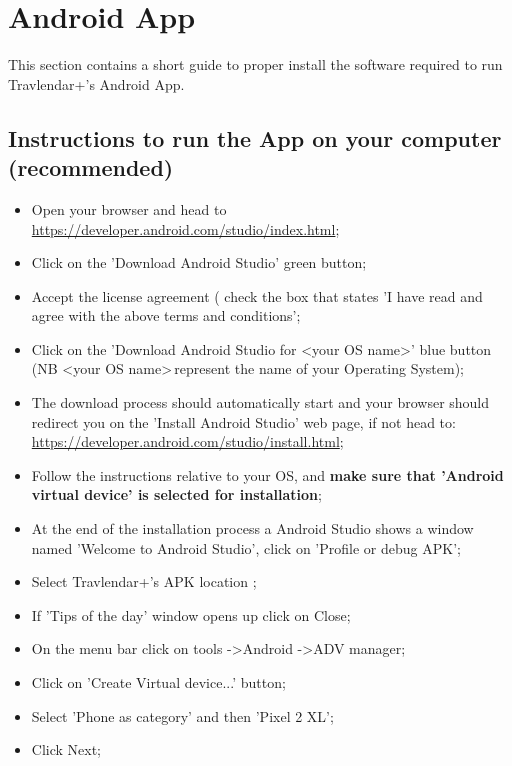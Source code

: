 \section{Android App}
\label{sect:Android App}
This section contains a short guide to proper install the software required to run Travlendar+'s Android App.

\subsection{Instructions to run the App on your computer (recommended)}
\label{subsect:Computer Instructions}
\begin{itemize}
	\item Open your browser and head to \\ \href{https://developer.android.com/studio/index.html}{\color{blue}https://developer.android.com/studio/index.html};
	\item Click on the 'Download Android Studio' green button;
	\item Accept the license agreement ( check the box that states 'I have read and agree with the above terms and conditions';
	\item Click on the 'Download Android Studio for \textless your OS name\textgreater' blue button (NB \textless your OS name\textgreater  \,represent the name of your Operating System);
	\item The download process should automatically start and your browser should redirect you on the 'Install Android Studio' web page, if not head to: \href{https://developer.android.com/studio/install.html}{\color{blue}https://developer.android.com/studio/install.html};
	\item Follow the instructions relative to your OS, and \textbf{make sure that 'Android virtual device' is selected for installation};
	\item At the end of the installation process a Android Studio shows a window named 'Welcome to Android Studio', click on 'Profile or debug APK';
	\item Select Travlendar+'s APK location ;
	\item If 'Tips of the day' window opens up click on Close;
	\item On the menu bar click on tools -\textgreater Android -\textgreater ADV manager;
	\item Click on 'Create Virtual device...' button;
	\item Select 'Phone as category' and then 'Pixel 2 XL';
	\item Click Next;

\end{itemize}
